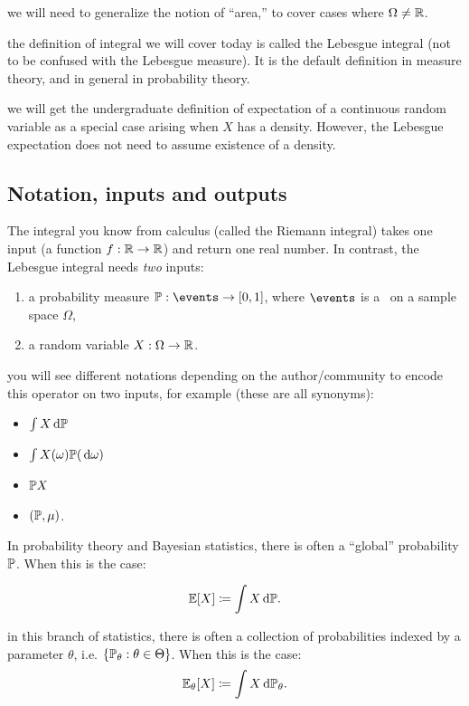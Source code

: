\documentclass{article}
\begin{document}
 we will need to generalize the notion of ``area,'' to cover cases where $\Omega \neq \R$.

 the definition of integral we will cover today is called the Lebesgue integral (not to be confused with the Lebesgue measure). It is the default definition in measure theory, and in general in probability theory.

 we will get the undergraduate definition of expectation of a continuous random variable as a special case arising when $X$ has a density. However, the Lebesgue expectation does not need to assume existence of a density.


\subsection{Notation, inputs and outputs}

The integral you know from calculus (called the Riemann integral) takes one input (a function $f : \R \to \R$) and return one real number. In contrast, the Lebesgue integral needs \emph{two} inputs:
\begin{enumerate}
  \item a probability measure $\P : \events \to [0, 1]$, where $\events$ is a \sigmaalg\ on a sample space $\Omega$,
  \item a random variable $X : \Omega \to \R$.
\end{enumerate}

 you will see different notations depending on the author/community to encode this operator on two inputs, for example (these are all synonyms):
\begin{itemize}
  \item $\int X \ud \P$
  \item $\int X(\omega) \P(\ud \omega)$
  \item $\P X$
  \item $(\P, \mu)$.
\end{itemize}

In probability theory and Bayesian statistics, there is often a ``global'' probability $\P$. When this is the case:

\[ \E[X] \defeq \int X \ud \P. \]



 in this branch of statistics, there is often a collection of probabilities indexed by a parameter $\theta$, i.e. $\{\P_\theta : \theta \in \Theta\}$. When this is the case:
\[ \E_\theta[X] \defeq \int X \ud \P_\theta. \]
\end{document}
